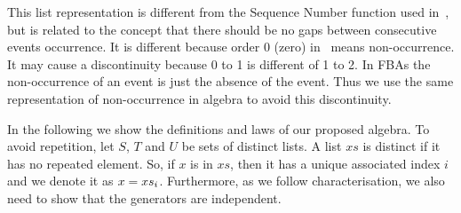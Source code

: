 \documentclass[12pt,openright,twoside,a4paper,oldfontcommands,english,brazil,draft]{abntex2}
\theoremstyle{theo}
\newcommand{\nth}[2]{\ensuremath #1_{#2}}
\def\algebraset{\ensuremath\operatorname{\mathbf{atf}}}
\begin{document}
This list representation is different from the Sequence Number function used in~\cite{WP2009,Walker2009}, but is related to the concept that there should be no gaps between consecutive events occurrence.
It is different because order 0 (zero) in~\cite{WP2009,Walker2009} means non-occurrence.
It may cause a discontinuity because 0 to 1 is different of 1 to 2.
In \acp{FBA} the non-occurrence of an event is just the absence of the event.
Thus we use the same representation of non-occurrence in \ac{algebra} to avoid this discontinuity.







In the following we show the definitions and laws of our proposed \ac{algebra}.
To avoid repetition, let $S$, $T$ and $U$ be sets of distinct lists.
A list $xs$ is distinct if it has no repeated element.
So, if $x$ is in $xs$, then it has a unique associated index $i$ and we denote it as $x = \nth{xs}{i}$.
Furthermore, as we follow  characterisation, we also need to show that the generators are independent.
\end{document}

